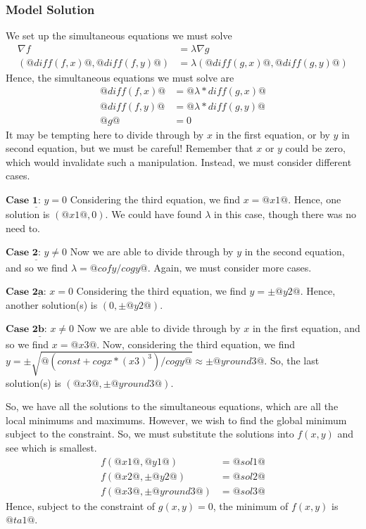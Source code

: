 \documentclass[a4paper,10pt]{article}
\begin{document}
\subsubsection{Model Solution}
We set up the simultaneous equations we must solve \begin{align*} \nabla f &= \lambda \nabla g \\ \left(@diff(f,x)@, @diff(f,y)@ \right) &= \lambda \left(@diff(g,x)@, @diff(g,y)@ \right) \end{align*} Hence, the simultaneous equations we must solve are \begin{align*} @diff(f,x)@ &= @\lambda * diff(g,x)@ \\ @diff(f,y)@ &= @\lambda * diff(g,y)@ \\ @g@ &= 0 \end{align*} It may be tempting here to divide through by \(x\) in the first equation, or by \(y\) in second equation, but we must be careful! Remember that \(x\) or \(y\) could be zero, which would invalidate such a manipulation. Instead, we must consider different cases.

\(\underline{\textbf{Case 1: } y=0}\)
Considering the third equation, we find \(x=@x1@\). Hence, one solution is \(\left(@x1@,0\right)\). We could have found \(\lambda\) in this case, though there was no need to.

\(\underline{\textbf{Case 2: } y\neq0}\)
Now we are able to divide through by \(y\) in the second equation, and so we find \(\lambda = @cofy/cogy@\). Again, we must consider more cases.

\(\underline{\textbf{Case 2a: } x=0}\)
Considering the third equation, we find \(y= \pm @y2@\). Hence, another solution(s) is \(\left(0,\pm @y2@\right)\).

\(\underline{\textbf{Case 2b: } x \neq 0}\)
Now we are able to divide through by \(x\) in the first equation, and so we find \(x = @x3@\). Now, considering the third equation, we find \(y = \pm  \sqrt{@(const+cogx*(x3)^3)/cogy@} \approx \pm @yround3@ \). So, the last solution(s) is \(\left(@x3@,\pm @yround3@\right)\).

So, we have all the solutions to the simultaneous equations, which are all the local minimums and maximums. However, we wish to find the global minimum subject to the constraint. So, we must substitute the solutions into \(f(x,y)\) and see which is smallest. \begin{align*} f\left(@x1@,@y1@\right) &= @sol1@ \\ f\left(@x2@,\pm @y2@\right) &= @sol2@ \\ f\left(@x3@,\pm @yround3@\right) &= @sol3@ \end{align*} Hence, subject to the constraint of \(g(x,y)=0\), the minimum of \(f(x,y)\) is \(@ta1@\).
\end{document}
